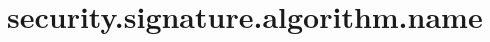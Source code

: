 \section{security.signature.algorithm.name}
\label{configuration:SecuritySignatureAlgorithmName}
\AvailableInJavaOnly{\TODO}